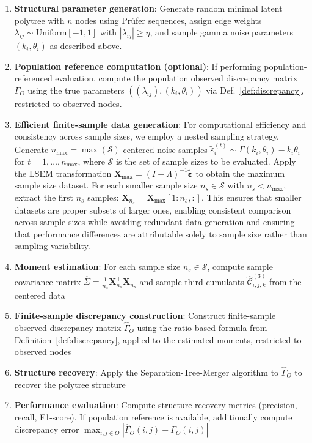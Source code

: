 \documentclass[11pt,a4paper]{article}
\numberwithin{equation}{section}
\begin{document}
\begin{enumerate}[label=\textbf{Step \arabic*:}]
\item \textbf{Structural parameter generation}: Generate random minimal latent polytree with $n$ nodes using Prüfer sequences, assign edge weights $\lambda_{ij} \sim \text{Uniform}[-1,1]$ with $|\lambda_{ij}| \geq \eta$, and sample gamma noise parameters $(k_i, \theta_i)$ as described above.\hfill\mbox{}

\item \textbf{Population reference computation (optional)}: If performing population-referenced evaluation, compute the population observed discrepancy matrix $\Gamma_O$ using the true parameters $((\lambda_{ij}), (k_i, \theta_i))$ via Def.~\ref{def:discrepancy}, restricted to observed nodes.

\item \textbf{Efficient finite-sample data generation}: For computational efficiency and consistency across sample sizes, we employ a nested sampling strategy. Generate $n_{\max} = \max(\mathcal{S})$ centered noise samples $\tilde{\varepsilon}_i^{(t)} \sim \Gamma(k_i, \theta_i) - k_i\theta_i$ for $t = 1, \ldots, n_{\max}$, where $\mathcal{S}$ is the set of sample sizes to be evaluated. Apply the LSEM transformation $\mathbf{X}_{\max} = (I - \Lambda)^{-1}\tilde{\boldsymbol{\varepsilon}}$ to obtain the maximum sample size dataset. For each smaller sample size $n_s \in \mathcal{S}$ with $n_s < n_{\max}$, extract the first $n_s$ samples: $\mathbf{X}_{n_s} = \mathbf{X}_{\max}[1:n_s, :]$. This ensures that smaller datasets are proper subsets of larger ones, enabling consistent comparison across sample sizes while avoiding redundant data generation and ensuring that performance differences are attributable solely to sample size rather than sampling variability.

\item \textbf{Moment estimation}: For each sample size $n_s \in \mathcal{S}$, compute sample covariance matrix $\hat{\Sigma} = \frac{1}{n_s}\mathbf{X}_{n_s}^\top\mathbf{X}_{n_s}$ and sample third cumulants $\hat{\mathcal{C}}^{(3)}_{i,j,k}$ from the centered data

\item \textbf{Finite-sample discrepancy construction}: Construct finite-sample observed discrepancy matrix $\hat{\Gamma}_O$ using the ratio-based formula from Definition~\ref{def:discrepancy}, applied to the estimated moments, restricted to observed nodes

\item \textbf{Structure recovery}: Apply the Separation-Tree-Merger algorithm to $\hat{\Gamma}_O$ to recover the polytree structure

\item \textbf{Performance evaluation}: Compute structure recovery metrics (precision, recall, F1-score). If population reference is available, additionally compute discrepancy error $\max_{i,j \in O}|\hat{\Gamma}_O(i,j) - \Gamma_O(i,j)|$
\end{enumerate}
\end{document}
